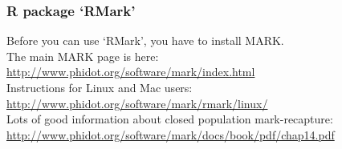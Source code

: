 \documentclass[color=usenames,dvipsnames]{beamer}\usepackage[]{graphicx}\usepackage[]{color}
\begin{document}














\begin{frame}
  \frametitle{R package `RMark'}
  Before you can use `RMark', you have to install MARK.  \\
  \vfill
  The main MARK page is here: \\
  {\color{blue} \url{ 
    http://www.phidot.org/software/mark/index.html
  }}  \\
  \vfill
  Instructions for Linux and Mac users: \\
   {\color{blue} \url{
    http://www.phidot.org/software/mark/rmark/linux/
  } } \\
  \vfill
  Lots of good information about closed population mark-recapture: \\
  {\color{blue} \footnotesize \url{ 
    http://www.phidot.org/software/mark/docs/book/pdf/chap14.pdf
  }}
\end{frame}
\end{document}
